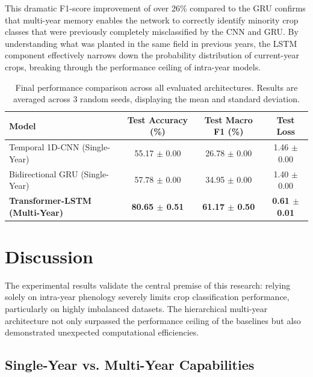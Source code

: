 This dramatic F1-score improvement of over 26\% compared to the GRU confirms that multi-year memory enables the network to correctly identify
minority crop classes that were previously completely misclassified by the CNN and GRU. By understanding what was planted in the same field in previous years,
the LSTM component effectively narrows down the probability distribution of current-year crops, breaking through the performance ceiling of intra-year models.

\begin{table}[htpb]
    \centering
    \renewcommand{\arraystretch}{1.2}
    \begin{tabular}{lccc}
        \toprule
        \textbf{Model} & \textbf{Test Accuracy (\%)} & \textbf{Test Macro F1 (\%)} & \textbf{Test Loss} \\
        \midrule
        Temporal 1D-CNN (Single-Year) & 55.17 $\pm$ 0.00 & 26.78 $\pm$ 0.00 & 1.46 $\pm$ 0.00 \\
        Bidirectional GRU (Single-Year) & 57.78 $\pm$ 0.00 & 34.95 $\pm$ 0.00 & 1.40 $\pm$ 0.00 \\
        \textbf{Transformer-LSTM (Multi-Year)} & \textbf{80.65 $\pm$ 0.51} & \textbf{61.17 $\pm$ 0.50} & \textbf{0.61 $\pm$ 0.01} \\
        \bottomrule
    \end{tabular}
    \caption{Final performance comparison across all evaluated architectures. Results are averaged across 3 random seeds, displaying the mean and standard deviation.}
    \label{tab:hybrid_comparison}
\end{table}


\section{Discussion}
\label{sec:discussion}

The experimental results validate the central premise of this research: relying solely on intra-year phenology severely limits crop
classification performance, particularly on highly imbalanced datasets.
The hierarchical multi-year architecture not only surpassed the performance ceiling of the baselines but also demonstrated unexpected computational efficiencies.

\subsection{Single-Year vs. Multi-Year Capabilities}
\label{subsec:single_vs_multi_year}

